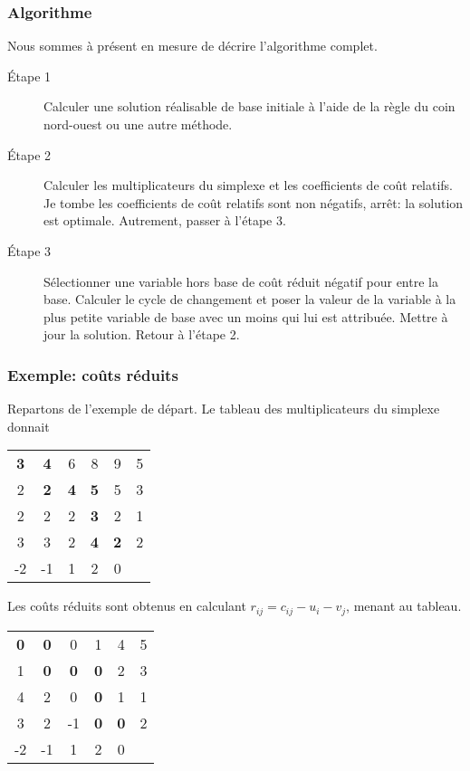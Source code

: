 \documentclass[usepdftitle=false]{beamer}
\begin{document}
\begin{frame}
	\frametitle{Algorithme}
	
Nous sommes à présent en mesure de décrire l'algorithme complet.

\begin{description}
\item[\'Etape 1]
Calculer une solution réalisable de base initiale à l'aide de la règle du coin nord-ouest ou une autre méthode.
\item[\'Etape 2]
Calculer les multiplicateurs du simplexe et les coefficients de coût relatifs. Je tombe
les coefficients de coût relatifs sont non négatifs, arrêt: la solution est optimale. Autrement,
passer à l'étape 3.
\item[\'Etape 3]
Sélectionner une variable hors base de coût réduit négatif pour entre la base.
Calculer le cycle de changement et poser la valeur de la variable à la plus petite variable de base avec un moins qui lui est attribuée.
Mettre à jour la solution. Retour à l'étape 2.
\end{description}

\end{frame}

\begin{frame}
\frametitle{Exemple: coûts réduits}

Repartons de l'exemple de départ. Le tableau des multiplicateurs du simplexe donnait
\begin{center}
	\begin{tabular}{ccccc|c}
		{\bf 3} & {\bf 4} & 6 & 8 & 9 & 5 \\
		2 & {\bf 2} & {\bf 4} & {\bf 5} & 5 & 3 \\
		2 & 2 & 2 & {\bf 3} & 2 & 1 \\
		3 & 3 & 2 & {\bf 4} & {\bf 2} & 2 \\
		\hline
		-2 & -1 & 1 & 2 & 0 & 
	\end{tabular}
\end{center}
Les coûts réduits sont obtenus en calculant $r_{ij} = c_{ij} - u_i - v_j$, menant au tableau.
\begin{center}
	\begin{tabular}{ccccc|c}
		{\bf 0} & {\bf 0} & 0 & 1 & 4 & 5 \\
		1 & {\bf 0} & {\bf 0} & {\bf 0} & 2 & 3 \\
		4 & 2 & 0 & {\bf 0} & 1 & 1 \\
		3 & 2 & -1 & {\bf 0} & {\bf 0} & 2 \\
		\hline
		-2 & -1 & 1 & 2 & 0 & 
	\end{tabular}
\end{center}

\end{frame}
\end{document}
